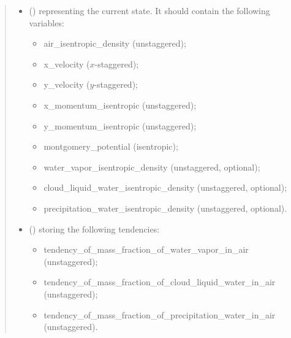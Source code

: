 \documentclass[letterpaper,10pt,english]{sphinxmanual}
\begin{document}
\begin{fulllineitems}
\begin{fulllineitems}
\begin{quote}
\begin{description}
\begin{itemize}
\item {} 
 () \textendash{} 
 representing the current state.
It should contain the following variables:
\begin{itemize}
\item {} 
air\_isentropic\_density (unstaggered);

\item {} 
x\_velocity (\(x\)-staggered);

\item {} 
y\_velocity (\(y\)-staggered);

\item {} 
x\_momentum\_isentropic (unstaggered);

\item {} 
y\_momentum\_isentropic (unstaggered);

\item {} 
montgomery\_potential (isentropic);

\item {} 
water\_vapor\_isentropic\_density (unstaggered, optional);

\item {} 
cloud\_liquid\_water\_isentropic\_density (unstaggered, optional);

\item {} 
precipitation\_water\_isentropic\_density (unstaggered, optional).

\end{itemize}


\item {} 
 () \textendash{} 
{\hyperref[\detokenize{api:storages.grid_data.GridData}]{}} storing the following tendencies:
\begin{itemize}
\item {} 
tendency\_of\_mass\_fraction\_of\_water\_vapor\_in\_air (unstaggered);

\item {} 
tendency\_of\_mass\_fraction\_of\_cloud\_liquid\_water\_in\_air (unstaggered);

\item {} 
tendency\_of\_mass\_fraction\_of\_precipitation\_water\_in\_air (unstaggered).

\end{itemize}


\end{itemize}


\end{description}
\end{quote}
\end{fulllineitems}
\end{fulllineitems}
\end{document}
